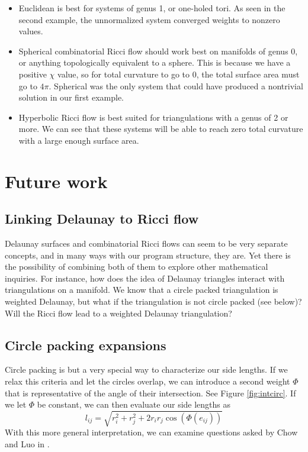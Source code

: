 \documentclass[12pt]{article}
\begin{document}
\begin{itemize}
\item Euclidean is best for systems of genus 1, or one-holed tori. As seen in the second example, the unnormalized system converged weights to nonzero values. 
\item Spherical combinatorial Ricci flow should work best on manifolds of genus 0, or anything topologically equivalent to a sphere. This is because we have a positive $\chi$ value, so for total curvature to go to 0, the total surface area must go to $4\pi$. Spherical was the only system that could have produced a nontrivial solution in our first example. 
\item Hyperbolic Ricci flow is best suited for triangulations with a genus of 2 or more. We can see that these systems will be able to reach zero total curvature with a large enough surface area. 
\end{itemize}

\section{Future work}
\label{Future}

\subsection{Linking Delaunay to Ricci flow}
Delaunay surfaces and combinatorial Ricci flows can seem to be very separate concepts, and in many ways with our program structure, they are. Yet there is the possibility of combining both of them to explore other mathematical inquiries. For instance, how does the idea of Delaunay triangles interact with triangulations on a manifold. We know that a circle packed triangulation is weighted Delaunay, but what if the triangulation is not circle packed (see below)? Will the Ricci flow lead to a weighted Delaunay triangulation?

\subsection{Circle packing expansions}
\label{circExt}

Circle packing is but a very special way to characterize our side lengths. If we relax this criteria and let the circles overlap, we can introduce a second weight $\Phi$ that is representative of the angle of their intersection. See Figure \ref{fig:intcirc}. If we let $\Phi$ be constant, we can then evaluate our side lengths as $$l_{ij} = \sqrt{r_i^2 + r_j^2 + 2r_ir_j\cos(\Phi(e_{ij}))}$$ With this more general interpretation, we can examine questions asked by Chow and Luo in \cite{chowluo}.
\end{document}
